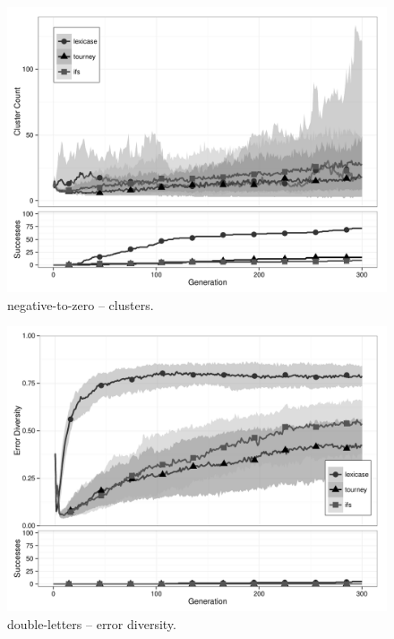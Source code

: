 \begin{figure}[p] %
\centering
\includegraphics[width=11.5cm]{negative-to-zero-cluster.pdf}
\caption{negative-to-zero -- clusters.}
\label{negative-to-zeroClu}
\end{figure}

\begin{figure}[p] %
\centering
\includegraphics[width=11.5cm]{double-letters-diversity.pdf}
\caption{double-letters -- error diversity.}
\label{double-lettersDiv}
\end{figure}

